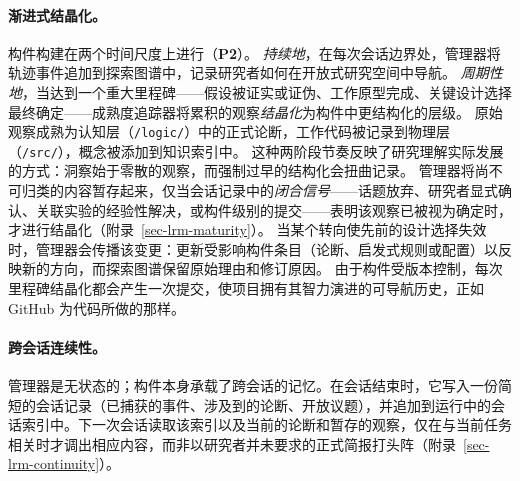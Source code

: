 \paragraph{渐进式结晶化。}
构件构建在两个时间尺度上进行（\textbf{P2}）。
\emph{持续地}，在每次会话边界处，管理器将轨迹事件追加到探索图谱中，记录研究者如何在开放式研究空间中导航。
\emph{周期性地}，当达到一个重大里程碑——假设被证实或证伪、工作原型完成、关键设计选择最终确定——成熟度追踪器将累积的观察\emph{结晶化}为构件中更结构化的层级。
原始观察成熟为认知层（\texttt{/logic/}）中的正式论断，工作代码被记录到物理层（\texttt{/src/}），概念被添加到知识索引中。
这种两阶段节奏反映了研究理解实际发展的方式：洞察始于零散的观察，而强制过早的结构化会扭曲记录。
管理器将尚不可归类的内容暂存起来，仅当会话记录中的\emph{闭合信号}——话题放弃、研究者显式确认、关联实验的经验性解决，或构件级别的提交——表明该观察已被视为确定时，才进行结晶化（附录~\ref{sec-lrm-maturity}）。
当某个转向使先前的设计选择失效时，管理器会传播该变更：更新受影响构件条目（论断、启发式规则或配置）以反映新的方向，而探索图谱保留原始理由和修订原因。
由于构件受版本控制，每次里程碑结晶化都会产生一次提交，使项目拥有其智力演进的可导航历史，正如 GitHub 为代码所做的那样。

\paragraph{跨会话连续性。}
管理器是无状态的；构件本身承载了跨会话的记忆。在会话结束时，它写入一份简短的会话记录（已捕获的事件、涉及到的论断、开放议题），并追加到运行中的会话索引中。下一次会话读取该索引以及当前的论断和暂存的观察，仅在与当前任务相关时才调出相应内容，而非以研究者并未要求的正式简报打头阵（附录~\ref{sec-lrm-continuity}）。
